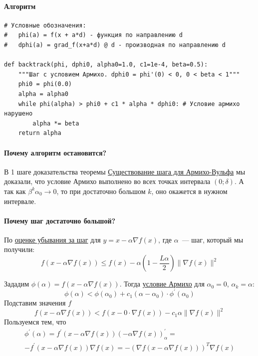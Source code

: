 

\paragraph*{Алгоритм}
\begin{Verbatim}[fontsize=\small]
# Условные обозначения:
#   phi(a) = f(x + a*d) - функция по направлению d
#   dphi(a) = grad_f(x+a*d) @ d - производная по направлению d

def backtrack(phi, dphi0, alpha0=1.0, c1=1e-4, beta=0.5):
    """Шаг с условием Армихо. dphi0 = phi'(0) < 0, 0 < beta < 1"""
    phi0 = phi(0.0)
    alpha = alpha0
    while phi(alpha) > phi0 + c1 * alpha * dphi0: # Условие армихо нарушено
        alpha *= beta
    return alpha
\end{Verbatim}

\paragraph*{Почему алгоритм остановится?}
В 1 шаге доказательства теоремы \hyperref[note:C143295F-C422-4FEE-95AD-3D6B620BC0E8]{Существование шага для Армихо-Вульфа} мы доказали, что условие Армихо выполнено во всех точках интервала $(0;\delta)$. А так как $\beta^k\alpha_0 \rightarrow 0$, то при достаточно большом $k$, оно окажется в нужном интервале.

\paragraph*{Почему шаг достаточно большой?}
По \hyperref[note:FFEA1F1D-B70C-4B4A-9386-8344A2A3BBC4]{оценке убывания за шаг} для $y = x - \alpha \nabla f(x)$, где $\alpha$~--- шаг, который мы получили:
\[
f(x - \alpha \nabla f(x)) \le f(x) - \alpha \left( 1 - \frac{L\alpha}{2} \right) \|\nabla f(x)\|^2
\]

Зададим $\phi(\alpha) = f(x - \alpha \nabla f(x))$. Тогда \hyperref[note:15611E05-13FC-4FB0-AE00-A4BB857A29E6]{условие Армихо} для $\alpha_0 = 0$, $\alpha_k = \alpha$:
\[
\phi(\alpha) < \phi(\alpha_0) + c_{1}(\alpha - \alpha_0) \cdot \phi^{\prime}(\alpha_0)
\]
Подставим значения $f$
\[
f(x - \alpha \nabla f(x)) <  f(x - 0 \cdot \nabla f(x)) - c_1 \alpha \| \nabla f(x) \|^2
\]
Пользуемся тем, что
\begin{multline*}
\phi^{\prime}(\alpha) =  f^{\prime}(x - \alpha\nabla f(x))(- \alpha \nabla f(x))^{\prime}_{\alpha} = \\  - f^{\prime}(x - \alpha\nabla f(x)) \nabla f(x) = - (\nabla f(x - \alpha \nabla f(x)))^T \nabla f(x)
\end{multline*}

